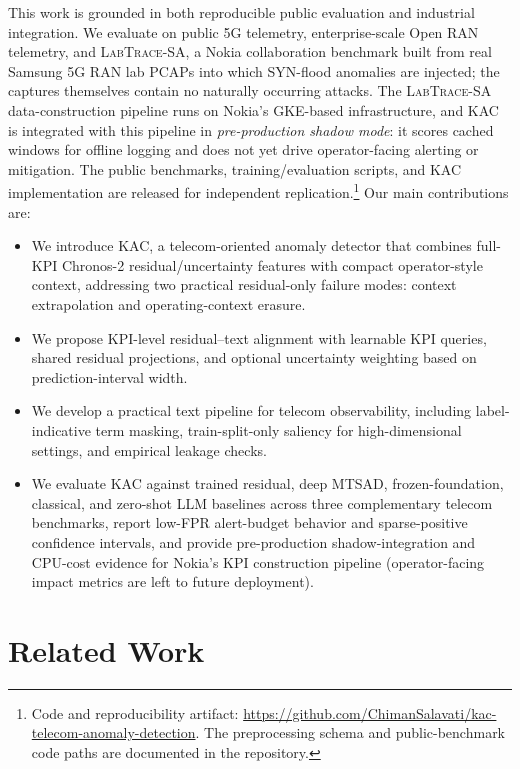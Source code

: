 \documentclass[conference]{IEEEtran}
\begin{document}
This work is grounded in both reproducible public evaluation and industrial integration. We evaluate on public 5G telemetry, enterprise-scale Open RAN telemetry, and \textsc{LabTrace-SA}, a Nokia collaboration benchmark built from real Samsung 5G RAN lab PCAPs into which SYN-flood anomalies are injected; the captures themselves contain no naturally occurring attacks. The \textsc{LabTrace-SA} data-construction pipeline runs on Nokia's GKE-based infrastructure, and KAC is integrated with this pipeline in \emph{pre-production shadow mode}: it scores cached windows for offline logging and does not yet drive operator-facing alerting or mitigation. The public benchmarks, training/evaluation scripts, and KAC implementation are released for independent replication.\footnote{Code and reproducibility artifact: \url{https://github.com/ChimanSalavati/kac-telecom-anomaly-detection}. The preprocessing schema and public-benchmark code paths are documented in the repository.} Our main contributions are:
\begin{itemize}[leftmargin=*,nosep]
    \item We introduce KAC, a telecom-oriented anomaly detector that combines full-KPI Chronos-2 residual/uncertainty features with compact operator-style context, addressing two practical residual-only failure modes: context extrapolation and operating-context erasure.

    \item We propose KPI-level residual--text alignment with learnable KPI queries, shared residual projections, and optional uncertainty weighting based on prediction-interval width.

    \item We develop a practical text pipeline for telecom observability, including label-indicative term masking, train-split-only saliency for high-dimensional settings, and empirical leakage checks.

    \item We evaluate KAC against trained residual, deep MTSAD, frozen-foundation, classical, and zero-shot LLM baselines across three complementary telecom benchmarks, report low-FPR alert-budget behavior and sparse-positive confidence intervals, and provide pre-production shadow-integration and CPU-cost evidence for Nokia's KPI construction pipeline (operator-facing impact metrics are left to future deployment).
\end{itemize}

\section{Related Work}
\label{sec:related}
\end{document}
